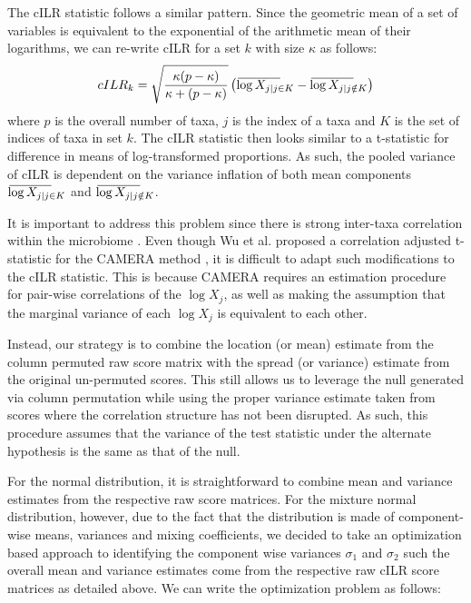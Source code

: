 \documentclass{article}
\newcommand{\overbar}[1]{\mkern 2mu\overline{\mkern-2mu#1\mkern-20mu}\mkern 20mu}
\begin{document}
The cILR statistic follows a similar pattern. Since the geometric mean of a set of variables is equivalent to the exponential of the arithmetic mean of their logarithms, we can re-write cILR for a set $k$ with size $\kappa$ as follows:  
\begin{equation}\label{eq:2}
    cILR_k = \sqrt{\frac{\kappa(p - \kappa)}{\kappa + (p - \kappa)}} \left( \overbar{\log{X_{j|j \in K}}} - \overbar{\log{X_{j|j \notin K}}} \right)   
\end{equation}
where $p$ is the overall number of taxa, $j$ is the index of a taxa and $K$ is the set of indices of taxa in set $k$. The cILR statistic then looks similar to a t-statistic for difference in means of log-transformed proportions. As such, the pooled variance of cILR is dependent on the variance inflation of both mean components $\overbar{\log{X_{j|j \in K}}}$ and $\overbar{\log{X_{j|j \notin K}}}$. 

It is important to address this problem since there is strong inter-taxa correlation within the microbiome \cite{kurtz2015}. Even though Wu et al. proposed a correlation adjusted t-statistic for the CAMERA method \cite{wu2012}, it is difficult to adapt such modifications to the cILR statistic. This is because CAMERA requires an estimation procedure for pair-wise correlations of the $\log{X_j}$, as well as making the assumption that the marginal variance of each $\log{X_j}$ is equivalent to each other. 

Instead, our strategy is to combine the location (or mean) estimate from the column permuted raw score matrix with the spread (or variance) estimate from the original un-permuted scores. This still allows us to leverage the null generated via column permutation while using the proper variance estimate taken from scores where the correlation structure has not been disrupted. As such, this procedure assumes that the variance of the test statistic under the alternate hypothesis is the same as that of the null.  

For the normal distribution, it is straightforward to combine mean and variance estimates from the respective raw score matrices. For the mixture normal distribution, however, due to the fact that the distribution is made of component-wise means, variances and mixing coefficients, we decided to take an optimization based approach to identifying the component wise variances $\sigma_1$ and $\sigma_2$ such the overall mean and variance estimates come from the respective raw cILR score matrices as detailed above. We can write the optimization problem as follows: 
\end{document}
